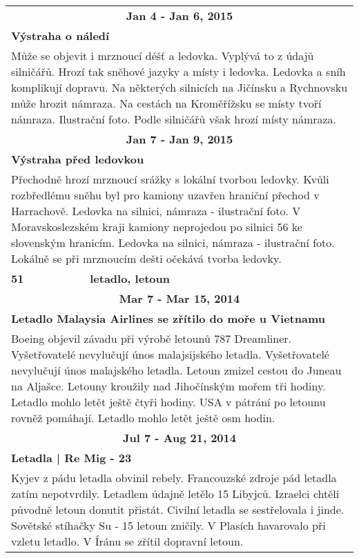 \begin{tabularx}{\linewidth}{l l}
                \multicolumn{2}{c}{\bf Jan 4 - Jan 6, 2015} \\
                \multicolumn{2}{p{\linewidth}}{\bf Výstraha o náledí} \\
                \multicolumn{2}{p{\linewidth}}{Může se objevit i mrznoucí déšť a ledovka. Vyplývá to z údajů silničářů. Hrozí tak sněhové jazyky a místy i ledovka. Ledovka a sníh komplikují dopravu. Na některých silnicích na Jičínsku a Rychnovsku může hrozit námraza. Na cestách na Kroměřížsku se místy tvoří námraza. Ilustrační foto. Podle silničářů však hrozí místy námraza.} \\ \midrule
                
                \multicolumn{2}{c}{\bf Jan 7 - Jan 9, 2015} \\
                \multicolumn{2}{p{\linewidth}}{\bf Výstraha před ledovkou} \\
                \multicolumn{2}{p{\linewidth}}{Přechodně hrozí mrznoucí srážky s lokální tvorbou ledovky. Kvůli rozbředlému sněhu byl pro kamiony uzavřen hraniční přechod v Harrachově. Ledovka na silnici, námraza - ilustrační foto. V Moravskoslezském kraji kamiony neprojedou po silnici 56 ke slovenským hranicím. Ledovka na silnici, námraza - ilustrační foto. Lokálně se při mrznoucím dešti očekává tvorba ledovky.} \\ \midrule
                [1.5pt]

            \bf 51 & \bf letadlo, letoun \\ \midrule
            
                \multicolumn{2}{c}{\bf Mar 7 - Mar 15, 2014} \\
                \multicolumn{2}{p{\linewidth}}{\bf Letadlo Malaysia Airlines se zřítilo do moře u Vietnamu} \\
                \multicolumn{2}{p{\linewidth}}{Boeing objevil závadu při výrobě letounů 787 Dreamliner. Vyšetřovatelé nevylučují únos malajsijského letadla. Vyšetřovatelé nevylučují únos malajského letadla. Letoun zmizel cestou do Juneau na Aljašce. Letouny kroužily nad Jihočínským mořem tři hodiny. Letadlo mohlo letět ještě čtyři hodiny. USA v pátrání po letounu rovněž pomáhají. Letadlo mohlo letět ještě osm hodin.} \\ \midrule
                
                \multicolumn{2}{c}{\bf Jul 7 - Aug 21, 2014} \\
                \multicolumn{2}{p{\linewidth}}{\bf Letadla | Re Mig - 23} \\
                \multicolumn{2}{p{\linewidth}}{Kyjev z pádu letadla obvinil rebely. Francouzské zdroje pád letadla zatím nepotvrdily. Letadlem údajně letělo 15 Libyjců. Izraelci chtěli původně letoun donutit přistát. Civilní letadla se sestřelovala i jinde. Sovětské stíhačky Su - 15 letoun zničily. V Plasích havarovalo při vzletu letadlo. V Íránu se zřítil dopravní letoun.} \\ \midrule
                

\end{tabularx}
